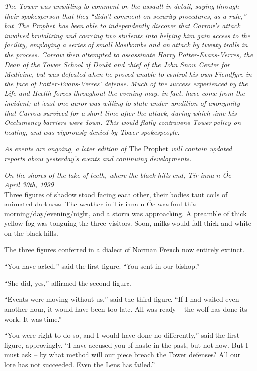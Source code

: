 \emph{The Tower was unwilling to comment on the assault in detail,
saying through their spokesperson that they ``didn't comment on security
procedures, as a rule,'' but~The Prophet~has been able to independently
discover that Carrow's attack involved brutalizing and coercing two
students into helping him gain access to the facility, employing a
series of small blastbombs and an attack by twenty trolls in the
process. Carrow then attempted to assassinate Harry Potter-Evans-Verres,
the Dean of the Tower School of Doubt and chief of the John Snow Center
for Medicine, but was defeated when he proved unable to control his own
Fiendfyre in the face of Potter-Evans-Verres' defense. Much of the
success experienced by the Life and Health forces throughout the evening
may, in fact, have come from the incident; at least one auror was
willing to state under condition of anonymity that Carrow survived for a
short time after the attack, during which time his Occlumency barriers
were down. This would flatly contravene Tower policy on healing, and was
vigorously denied by Tower spokespeople.}

\emph{As events are ongoing, a later edition of}~The Prophet~\emph{will
contain updated reports about yesterday's events and continuing
developments.}

\mybreak
\pagebreak

\emph{On the shores of the lake of teeth, where the black hills end, Tír
inna n-Óc}\\
\emph{April 30th, 1999}\\

Three figures of shadow stood facing each other, their bodies taut coils
of animated darkness. The weather in Tír inna n-Óc was foul this
morning/day/evening/night, and a storm was approaching. A preamble of
thick yellow fog was tonguing the three visitors. Soon, milks would fall
thick and white on the black hills.

The three figures conferred in a dialect of Norman French now entirely
extinct.

``You have acted,'' said the first figure. ``You sent in our bishop.''

``She did, yes,'' affirmed the second figure.

``Events were moving without us,'' said the third figure. ``If I had
waited even another hour, it would have been too late. All was ready --
the wolf has done its work. It was time.''

``You were right to do so, and I would have done no differently,'' said
the first figure, approvingly. ``I have accused you of haste in the
past, but not now. But I must ask -- by what method will our piece
breach the Tower defenses? All our lore has not succeeded. Even the Lens
has failed.''

